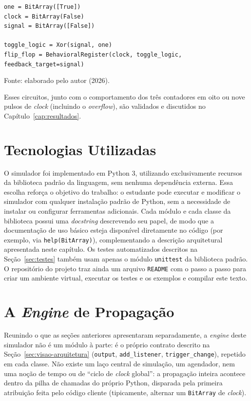 \begin{exemplo}[H]
\caption{\textit{Flip-flop} \textit{toggle}.}
\label{ex:toggle}
\begin{verbatim}
one = BitArray([True])
clock = BitArray(False)
signal = BitArray([False])

toggle_logic = Xor(signal, one)
flip_flop = BehavioralRegister(clock, toggle_logic, feedback_target=signal)
\end{verbatim}
\begin{center}
\footnotesize Fonte: elaborado pelo autor (2026).
\end{center}
\end{exemplo}

Esses circuitos, junto com o comportamento dos três contadores em oito ou nove pulsos de \textit{clock} (incluindo o \textit{overflow}), são validados e discutidos no Capítulo~\ref{cap:resultados}.

\section{Tecnologias Utilizadas}

O simulador foi implementado em Python 3, utilizando exclusivamente recursos da biblioteca padrão da linguagem, sem nenhuma dependência externa. Essa escolha reforça o objetivo do trabalho: o estudante pode executar e modificar o simulador com qualquer instalação padrão de Python, sem a necessidade de instalar ou configurar ferramentas adicionais. Cada módulo e cada classe da biblioteca possui uma \textit{docstring} descrevendo seu papel, de modo que a documentação de uso básico esteja disponível diretamente no código (por exemplo, via \texttt{help(BitArray)}), complementando a descrição arquitetural apresentada neste capítulo. Os testes automatizados descritos na Seção~\ref{sec:testes} também usam apenas o módulo \texttt{unittest} da biblioteca padrão. O repositório do projeto \cite{esteche2026} traz ainda um arquivo \texttt{README} com o passo a passo para criar um ambiente virtual, executar os testes e os exemplos e compilar este texto.

\section{A \textit{Engine} de Propagação}
\label{sec:motor-interno}

Reunindo o que as seções anteriores apresentaram separadamente, a \textit{engine} deste simulador não é um módulo à parte: é o próprio contrato descrito na Seção~\ref{sec:visao-arquitetura} (\texttt{output}, \texttt{add\_listener}, \texttt{trigger\_change}), repetido em cada classe. Não existe um laço central de simulação, um agendador, nem uma noção de tempo ou de ``ciclo de \textit{clock} global'': a propagação inteira acontece dentro da pilha de chamadas do próprio Python, disparada pela primeira atribuição feita pelo código cliente (tipicamente, alternar um \texttt{BitArray} de \textit{clock}).

